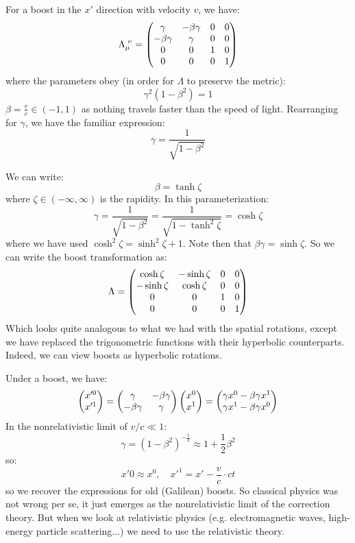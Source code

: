 For a boost in the $x'$ direction with velocity $v$, we have:
\begin{equation}
    \Lambda_{\mu}^{\sp\nu} = \m{\gamma & -\beta \gamma & 0 & 0 \\ -\beta \gamma & \gamma & 0 & 0 \\ 0 & 0 & 1 & 0 \\ 0 & 0 & 0 & 1}
\end{equation}
where the parameters obey (in order for $\Lambda$ to preserve the metric):
\begin{equation}
    \gamma^2(1 - \beta^2) = 1
\end{equation}
$\beta = \frac{v}{c} \in (-1, 1)$ as nothing travels faster than the speed of light. Rearranging for $\gamma$, we have the familiar expression:
\begin{equation}
    \gamma = \frac{1}{\sqrt{1 - \beta^2}}
\end{equation}

We can write:
\begin{equation}
    \beta = \tanh\zeta
\end{equation}
where $\zeta \in (-\infty, \infty)$ is the rapidity. In this parameterization:
\begin{equation}
    \gamma = \frac{1}{\sqrt{1-\beta^2}} = \frac{1}{\sqrt{1 - \tanh^2\zeta}} = \cosh\zeta
\end{equation}
where we have used $\cosh^2\zeta = \sinh^2\zeta + 1$. Note then that $\beta\gamma = \sinh\zeta$. So we can write the boost transformation as:
\begin{equation}
    \Lambda = \begin{pmatrix}\cosh\zeta & -\sinh\zeta & 0 & 0 \\ -\sinh\zeta & \cosh\zeta & 0 & 0 \\ 0 & 0 & 1 & 0 \\ 0 & 0 & 0 & 1\end{pmatrix}
\end{equation}
Which looks quite analogous to what we had with the spatial rotations, except we have replaced the trigonometric functions with their hyperbolic counterparts. Indeed, we can view boosts as hyperbolic rotations.

Under a boost, we have:
\begin{equation}
    \begin{pmatrix}x'^0 \\ x'^1\end{pmatrix} = \begin{pmatrix}\gamma & -\beta\gamma \\ -\beta\gamma & \gamma\end{pmatrix}\begin{pmatrix}x^0 \\ x^1\end{pmatrix} = \begin{pmatrix}\gamma x^0 - \beta\gamma x^1 \\ \gamma x^1 - \beta\gamma x^0\end{pmatrix}
\end{equation}
In the nonrelativistic limit of $v/c \ll 1$:
\begin{equation}
    \gamma = (1-\beta^2)^{-\frac{1}{2}} \approx 1 + \frac{1}{2}\beta^2
\end{equation}
so:
\begin{equation}
    x'0 \approx x^0, \quad x'^1 = x' - \frac{v}{c}\cdot c t
\end{equation}
so we recover the expressions for old (Galilean) boosts. So classical physics was not wrong per se, it just emerges as the nonrelativistic limit of the correction theory. But when we look at relativistic physics (e.g. electromagnetic waves, high-energy particle scattering...) we need to use the relativistic theory.

